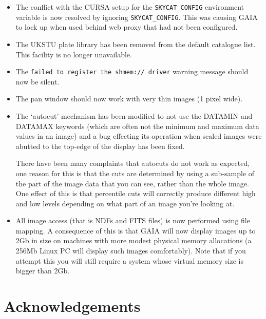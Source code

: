 \documentclass[twoside,11pt]{article}
\newcommand{\xref}[3]{#1}
\newcommand{\xlabel}[1]{}
\renewcommand{\_}{\texttt{\symbol{95}}}
\begin{document}
\begin{itemize}
     \item The conflict with the \xref{CURSA}{sun190}{} setup for the
       \verb+SKYCAT_CONFIG+ environment variable is now resolved by ignoring
       \verb+SKYCAT_CONFIG+. This was causing GAIA to lock up when used behind 
       web proxy that had not been configured.

     \item The UKSTU plate library has been removed from the default
       catalogue list. This facility is no longer unavailable.

     \item The \verb+failed to register the shmem:// driver+ warning message
       should now be silent.

     \item The pan window should now work with very thin images (1 pixel wide).

     \item The `autocut' mechanism has been modified to not use the
       DATAMIN and DATAMAX keywords (which are often not the minimum and
       maximum data values in an image) and a bug effecting its
       operation when scaled images were abutted to the top-edge of the
       display has been fixed.

       There have been many complaints that autocuts do not work as
       expected, one reason for this is that the cuts are determined
       by using a sub-sample of the part of the image data that you
       can see, rather than the whole image. One effect of this is
       that percentile cuts will correctly produce different high and
       low levels depending on what part of an image you're looking
       at.

     \item All image access (that is NDFs and FITS files) is now
       performed using file mapping. A consequence of this is that 
       GAIA will now display images up to 2Gb in size on machines with
       more modest physical memory allocations (a 256Mb Linux PC will
       display such images comfortably). Note that if you attempt this
       you will still require a system whose virtual memory size is
       bigger than 2Gb.
\end{itemize}

\section{\xlabel{acknowledgements}Acknowledgements}
\end{document}
